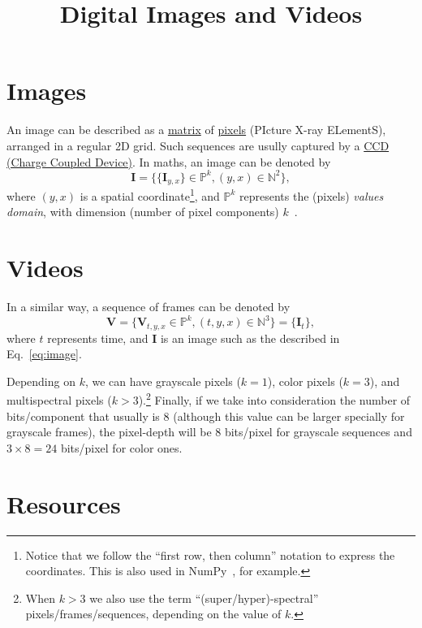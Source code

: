 
\title{Digital Images and Videos}

\maketitle

\tableofcontents

\section{Images}
An image can be described as a
\href{https://en.wikipedia.org/wiki/Matrix_(mathematics)}{matrix} of
\href{https://en.wikipedia.org/wiki/Pixel}{pixels} (PIcture X-ray
ELementS), arranged in a regular 2D grid. Such sequences are
usully captured by a
\href{https://en.wikipedia.org/wiki/Charge-coupled_device}{CCD (Charge
  Coupled Device)}. In maths, an image can be denoted by
\begin{equation}
  {\mathbf I} = \{\{{\mathbf I}_{y,x}\}\in\mathbb{P}^{k}, (y,x)\in\mathbb{N}^2\},
  \label{eq:image}
\end{equation}
where $(y,x)$ is a spatial coordinate\footnote{Notice that we follow
the ``first row, then column'' notation to express the
coordinates. This is also used in NumPy~\cite{harris2020array}, for
example.}, and $\mathbb{P}^{k}$ represents the (pixels) \emph{values
domain}, with dimension (number of pixel components)
$k$~\cite{burger2016digital}.

\section{Videos}
In a similar way, a sequence of frames can be denoted by
\begin{equation}
  {\mathbf V} = \{{\mathbf V}_{t,y,x}\in\mathbb{P}^{k}, (t,y,x)\in\mathbb{N}^3\} = \{{\mathbf I}_t\},
  \label{eq:video}
\end{equation}
where $t$ represents time, and ${\mathbf I}$ is an image such
as the described in Eq.~\eqref{eq:image}.

Depending on $k$, we can have grayscale pixels ($k=1$), color pixels
($k=3$), and multispectral pixels ($k>3$).\footnote{When $k>3$ we also
use the term ``(super/hyper)-spectral'' pixels/frames/sequences, depending
on the value of $k$.} Finally, if we take into consideration the
number of bits/component that usually is $8$ (although this value can be larger
specially for grayscale frames), the pixel-depth will be $8$
bits/pixel for grayscale sequences and $3\times 8=24$ bits/pixel for
color ones.

\section{Resources}

\renewcommand{\addcontentsline}[3]{}%

